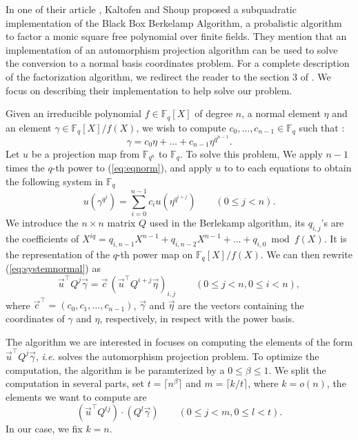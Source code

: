 \documentclass[12pt]{article}
\theoremstyle{plain}
\theoremstyle{definition}
\def\F{\ensuremath{\mathbb{F}}}
\newcounter{algorithm}
\begin{document}
In one of their article \cite{}, Kaltofen and Shoup proposed a subquadratic
implementation of the Black Box Berkelamp Algorithm, a probalistic algorithm to
factor a monic square free polynomial over finite fields. They mention that
an implementation of an automorphism projection algorithm can be used to solve 
the conversion to a normal basis coordinates problem. For a complete description
of the factorization algorithm, we redirect the reader to the section 3 of 
\cite{}. We focus on describing their implementation to help solve our problem.

Given an irreducible polynomial $f\in\F_q[X]$ of degree $n$, a normal element 
$\eta$ and an element $\gamma\in\F_q[X]/f(X)$, we wish to compute $c_0,\dots,
c_{n-1}\in\F_q$ such that :
\begin{equation}
\label{eq:eqnorm}
\gamma=c_0\eta+\dots+c_{n-1}\eta^{q^{n-1}}.
\end{equation}
Let $u$ be a projection map from $\F_{q^n}$ to $\F_q$. To solve this problem, 
We apply $n-1$ times the $q$-th power to (\ref{eq:eqnorm}), and apply $u$ to 
to each equations to obtain the following system in $\F_q$
\begin{equation}
\label{eq:systemnormal}
u(\gamma^{q^j})=\sum_{i=0}^{n-1}{c_iu(\eta^{q^{i+j}})}\qquad(0\leq j<n).
\end{equation}
We introduce the $n\times n$ matrix $Q$ used in the Berlekamp algorithm, its
$q_{i,j}$'s are the coefficients of
$X^{iq}=q_{i,n-1}X^{n-1}+q_{i,n-2}X^{n-1}+\dots+q_{i,0}\bmod f(X)$. It 
is the representation of the $q$-th power map on $\F_q[X]/f(X)$.
We can then rewrite (\ref{eq:systemnormal}) as
\begin{equation}
\label{eq:linalgnormal}
\vec{u}^\top Q^j\vec{\gamma}= \vec{c}\,(\vec{u}^\top Q^{i+j}\vec{\eta})_{i,j}
\qquad(0\leq j<n, 0\leq i<n),
\end{equation}
where $\vec{c}^\top=(c_0,c_1,\dots,c_{n-1})$, $\vec{\gamma}$ and $\vec{\eta}$
are the vectors containing the coordinates of $\gamma$ and $\eta$, respectively, 
in respect with the power basis.

The algorithm we are interested in focuses on computing the elements of the form 
$\vec{u}^\top Q^j\vec{\gamma}$, \emph{i.e.} solves the automorphism projection 
problem. To optimize the computation, the algorithm is be paramterized by a
$0\leq\beta\leq1$. We split the computation in several parts, set 
$t=\lceil{n^\beta}\rceil$ and $m=\lceil{k/t}\rceil$, where $k=o(n)$, the 
elements we want to compute are
\begin{equation}
\label{eq:normalsplit}
(\vec{u}^\top Q^{tj})\cdot(Q^l\vec{\gamma})\qquad(0\leq j<m, 0\leq l <t).
\end{equation}
In our case, we fix $k=n$.
\end{document}
